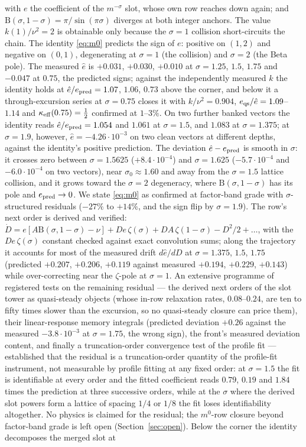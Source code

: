 \documentclass[11pt,a4paper]{article}
\theoremstyle{plain}
\theoremstyle{definition}
\newcommand{\Bfun}{\mathrm{B}}
\begin{document}
with $e$ the coefficient of the $m^{-\sigma}$ slot, whose own row reaches down again; and $\Bfun(\sigma,1-\sigma)=\pi/\sin(\pi\sigma)$ diverges at both integer anchors. The value $k(1)/\nu^2=2$ is obtainable only because the $\sigma=1$ collision short-circuits the chain. The identity \eqref{eq:m0} predicts the sign of $e$: positive on $(1,2)$ and negative on $(0,1)$, degenerating at $\sigma=1$ (the collision) and $\sigma=2$ (the Beta pole). The measured $\hat e$ is $+0.031$, $+0.030$, $+0.010$ at $\sigma=1.25$, $1.5$, $1.75$ and $-0.047$ at $0.75$, the predicted signs; against the independently measured $k$ the identity holds at $\hat e/e_{\rm pred}=1.07$, $1.06$, $0.73$ above the corner, and below it a through-excursion series at $\sigma=0.75$ closes it with $k/\nu^2=0.904$, $e_{\rm qs}/\hat e=1.09$--$1.14$ and $\kappa_{\rm eff}(0.75)=\tfrac12$ confirmed at $1$--$3\%$. On two further banked vectors the identity reads $\hat e/e_{\rm pred}=1.054$ and $1.061$ at $\sigma=1.5$, and $1.083$ at $\sigma=1.375$; at $\sigma=1.9$, however, $\hat e=-4.26\cdot10^{-3}$ on two clean vectors at different depths, against the identity's positive prediction. The deviation $\hat e-e_{\rm pred}$ is smooth in $\sigma$: it crosses zero between $\sigma=1.5625$ ($+8.4\cdot10^{-4}$) and $\sigma=1.625$ ($-5.7\cdot10^{-4}$ and $-6.0\cdot10^{-4}$ on two vectors), near $\sigma_0\approx1.60$ and away from the $\sigma=1.5$ lattice collision, and it grows toward the $\sigma=2$ degeneracy, where $\Bfun(\sigma,1-\sigma)$ has its pole and $e_{\rm pred}\to0$. We state \eqref{eq:m0} as confirmed at factor-band grade with $\sigma$-structured residuals ($-27\%$ to $+14\%$, and the sign flip by $\sigma=1.9$). The row's next order is derived and verified: $\dot D=e[A\Bfun(\sigma,1-\sigma)-\nu]+De\,\zeta(\sigma)+DA\,\zeta(1-\sigma)-D^2/2+\dots$, with the $De\,\zeta(\sigma)$ constant checked against exact convolution sums; along the trajectory it accounts for most of the measured drift $d\hat e/dD$ at $\sigma=1.375$, $1.5$, $1.75$ (predicted $+0.207$, $+0.206$, $+0.119$ against measured $+0.194$, $+0.229$, $+0.143$) while over-correcting near the $\zeta$-pole at $\sigma=1$. An extensive programme of registered tests on the remaining residual --- the derived next orders of the slot tower as quasi-steady objects (whose in-row relaxation rates, $0.08$--$0.24$, are ten to fifty times slower than the excursion, so no quasi-steady closure can price them), their linear-response memory integrals (predicted deviation $+0.26$ against the measured $-3.8\cdot10^{-3}$ at $\sigma=1.75$, the wrong sign), the front's measured deviation content, and finally a truncation-order convergence test of the profile fit --- established that the residual is a truncation-order quantity of the profile-fit instrument, not measurable by profile fitting at any fixed order: at $\sigma=1.5$ the fit is identifiable at every order and the fitted coefficient reads $0.79$, $0.19$ and $1.84$ times the prediction at three successive orders, while at the $\sigma$ where the derived slot powers form a lattice of spacing $1/4$ or $1/8$ the fit loses identifiability altogether. No physics is claimed for the residual; the $m^0$-row closure beyond factor-band grade is left open (Section~\ref{sec:open}). Below the corner the identity decomposes the merged slot at 
\end{document}

